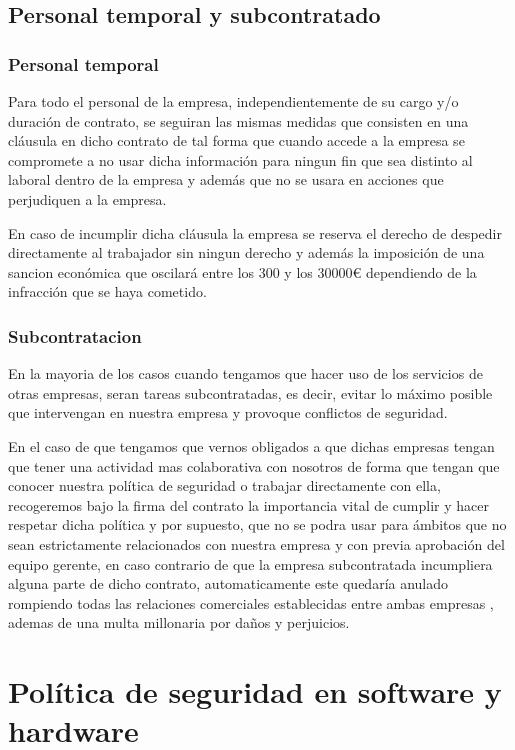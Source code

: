 \documentclass[11pt,bibtotoc,noliststotoc,BCOR0mm]{scrbook}
\begin{document}
\section{Personal temporal y subcontratado}

\subsection{Personal temporal}
Para todo el personal de la empresa, independientemente de su cargo y/o duración de contrato, se seguiran las mismas medidas que consisten en una cláusula en dicho contrato de tal forma que cuando accede a la empresa se compromete a no usar dicha información para ningun fin que sea distinto al laboral dentro de la empresa y además que no se usara en acciones que perjudiquen a la empresa.

En caso de incumplir dicha cláusula la empresa se reserva el derecho de despedir directamente al trabajador sin ningun derecho y además la imposición de una sancion económica que oscilará entre los 300 y los 30000€ dependiendo de la infracción que se haya cometido.
\subsection{Subcontratacion}
En la mayoria de los casos cuando tengamos que hacer uso de los servicios de otras empresas, seran tareas subcontratadas, es decir, evitar lo máximo posible que intervengan en nuestra empresa y provoque conflictos de seguridad.

En el caso de que tengamos que vernos obligados a que dichas empresas tengan que tener una actividad mas colaborativa con nosotros de forma que tengan que conocer nuestra política de seguridad o trabajar directamente con ella, recogeremos bajo la firma del contrato la importancia vital de cumplir y hacer respetar dicha política y por supuesto, que no se podra usar para ámbitos que no sean estrictamente relacionados con nuestra empresa y con previa aprobación del equipo gerente, en caso contrario de que la empresa subcontratada incumpliera alguna parte de dicho contrato, automaticamente este quedaría anulado rompiendo todas las relaciones comerciales establecidas entre ambas empresas , ademas de una multa millonaria por daños y perjuicios.

\chapter{Política de seguridad en software y hardware}
\label{ch:swhw}
\end{document}
